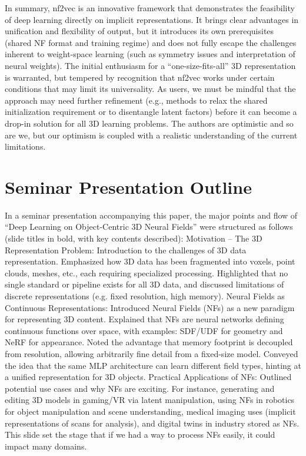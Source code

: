 \documentclass[11pt]{article}
\begin{document}
In summary, nf2vec is an innovative framework that demonstrates the feasibility of deep learning directly on implicit representations. It brings clear advantages in unification and flexibility of output, but it introduces its own prerequisites (shared NF format and training regime) and does not fully escape the challenges inherent to weight-space learning (such as symmetry issues and interpretation of neural weights). The initial enthusiasm for a “one-size-fits-all” 3D representation is warranted, but tempered by recognition that nf2vec works under certain conditions that may limit its universality. As users, we must be mindful that the approach may need further refinement (e.g., methods to relax the shared initialization requirement or to disentangle latent factors) before it can become a drop-in solution for all 3D learning problems. The authors are optimistic and so are we, but our optimism is coupled with a realistic understanding of the current limitations. \section{Seminar Presentation Outline}
In a seminar presentation accompanying this paper, the major points and flow of “Deep Learning on Object-Centric 3D Neural Fields” were structured as follows (slide titles in bold, with key contents described):
Motivation – The 3D Representation Problem: Introduction to the challenges of 3D data representation. Emphasized how 3D data has been fragmented into voxels, point clouds, meshes, etc., each requiring specialized processing. Highlighted that no single standard or pipeline exists for all 3D data, and discussed limitations of discrete representations (e.g. fixed resolution, high memory).
Neural Fields as Continuous Representations: Introduced Neural Fields (NFs) as a new paradigm for representing 3D content. Explained that NFs are neural networks defining continuous functions over space, with examples: SDF/UDF for geometry and NeRF for appearance. Noted the advantage that memory footprint is decoupled from resolution, allowing arbitrarily fine detail from a fixed-size model. Conveyed the idea that the same MLP architecture can learn different field types, hinting at a unified representation for 3D objects.
Practical Applications of NFs: Outlined potential use cases and why NFs are exciting. For instance, generating and editing 3D models in gaming/VR via latent manipulation, using NFs in robotics for object manipulation and scene understanding, medical imaging uses (implicit representations of scans for analysis), and digital twins in industry stored as NFs. This slide set the stage that if we had a way to process NFs easily, it could impact many domains.
\end{document}
